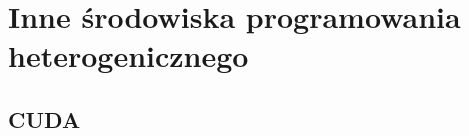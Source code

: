 
\section{Inne środowiska programowania heterogenicznego}\label{sec:others}

\subsection{CUDA}\label{sec:cuda}











